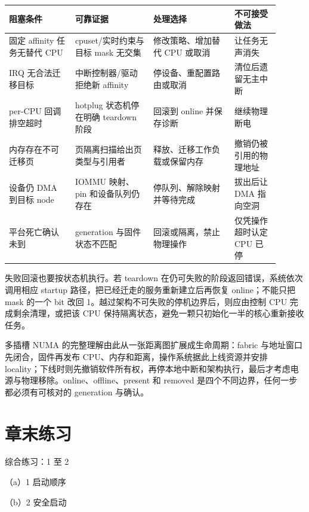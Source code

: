 \begin{longtable}{L{0.22\linewidth}L{0.26\linewidth}L{0.27\linewidth}L{0.15\linewidth}}
\toprule
阻塞条件 & 可靠证据 & 处理选择 & 不可接受做法 \\
\midrule
固定 affinity 任务无替代 CPU & cpuset/实时约束与目标 mask 无交集 & 修改策略、增加替代 CPU 或取消 & 让任务无声消失 \\\tablerowrule
IRQ 无合法迁移目标 & 中断控制器/驱动拒绝新 affinity & 停设备、重配置路由或取消 & 清位后遗留无主中断 \\\tablerowrule
per-CPU 回调排空超时 & hotplug 状态机停在明确 teardown 阶段 & 回滚到 online 并保存诊断 & 继续物理断电 \\\tablerowrule
内存存在不可迁移页 & 页隔离扫描给出页类型与引用者 & 释放、迁移工作负载或保留内存 & 撤销仍被引用的物理地址 \\\tablerowrule
设备仍 DMA 到目标 node & IOMMU 映射、pin 和设备队列仍存在 & 停队列、解除映射并等待完成 & 拔出后让 DMA 指向空洞 \\\tablerowrule
平台死亡确认未到 & generation 与固件状态不匹配 & 回滚或隔离，禁止物理操作 & 仅凭操作超时认定 CPU 已停 \\
\bottomrule
\end{longtable}

失败回滚也要按状态机执行。若 teardown 在仍可失败的阶段返回错误，系统依次调用相应 startup 路径，把已经迁走的服务重新建立后再恢复 online；不能只把 mask 的一个 bit 改回 1。越过架构不可失败的停机边界后，则应由控制 CPU 完成剩余清理，或把该 CPU 保持隔离状态，避免一颗只初始化一半的核心重新接收任务。

多插槽 NUMA 的完整理解由此从一张距离图扩展成生命周期：fabric 与地址窗口先闭合，固件再发布 CPU、内存和距离，操作系统据此上线资源并安排 locality；下线时则先撤销软件所有权，再停本地中断和架构执行，最后才考虑电源与物理移除。online、offline、present 和 removed 是四个不同边界，任何一步都必须有可核对的 generation 与确认。

\section*{章末练习}

\begin{chapterexercise}{综合练习：1 至 2}
\begin{exercisesubproblem}{（a）1}
启动顺序
\end{exercisesubproblem}
\begin{exercisesubproblem}{（b）2}
安全启动
\end{exercisesubproblem}
\end{chapterexercise}

